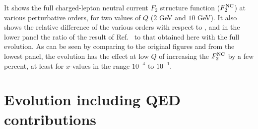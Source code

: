 %
It shows the full charged-lepton neutral current $F_2$ structure
function ($F_2^{\rm NC}$) at various perturbative orders, for two
values of $Q$ ($2$ GeV and $10$ GeV). It also shows the relative
difference of the various orders with respect to \ntlo, and in the
lower panel the ratio of the \ntlo result of
Ref.~\cite{Bertone:2024dpm} to that obtained here with the full
evolution.
%
As can be seen by comparing to the original figures and from the lowest
panel, the \ntlo evolution has the effect at low $Q$ of increasing the
\ntlo $F_2^{\rm NC}$ by a few percent, at least for $x$-values in the range
$10^{-4}$ to $10^{-1}$.
%


\section{Evolution including QED contributions}
\label{sec:qed-evolution}

